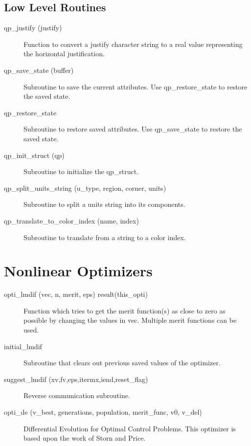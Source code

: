 \subsection{Low Level Routines}

\begin{description}

\item[qp\_justify (justify)] \Newline 
     Function to convert a justify character string to a real value
     representing the horizontal justification. 

\item[qp\_save\_state (buffer)] \Newline 
     Subroutine to save the current attributes. 
     Use qp\_restore\_state to restore the saved state.

\item[qp\_restore\_state] \Newline 
     Subroutine to restore saved attributes. 
     Use qp\_save\_state to restore the saved state.

\item[qp\_init\_struct (qp)] \Newline 
     Subroutine to initialize the qp\_struct.

\item[qp\_split\_units\_string (u\_type, region, corner, units)] \Newline 
     Subroutine to split a units string into its components.

\item[qp\_translate\_to\_color\_index (name, index)] \Newline 
     Subroutine to translate from a string to a color index.

\end{description}

\section{Nonlinear Optimizers}
\label{r:opti}      

\begin{description}

\item[opti\_lmdif (vec, n, merit, eps) result(this\_opti)] \Newline 
     Function which tries to get the merit function(s) as close to zero as possible
     by changing the values in vec. Multiple merit functions can be used.

\item[initial\_lmdif] \Newline 
     Subroutine that clears out previous saved values of the optimizer.

\item[suggest\_lmdif (xv,fv,eps,itermx,iend,reset\_flag)] \Newline 
     Reverse communication subroutine. 

\item[opti\_de (v\_best, generations, population, merit\_func, v0, v\_del)] \Newline 
     Differential Evolution for Optimal Control Problems.
     This optimizer is based upon the work of Storn and Price. 

\end{description}

